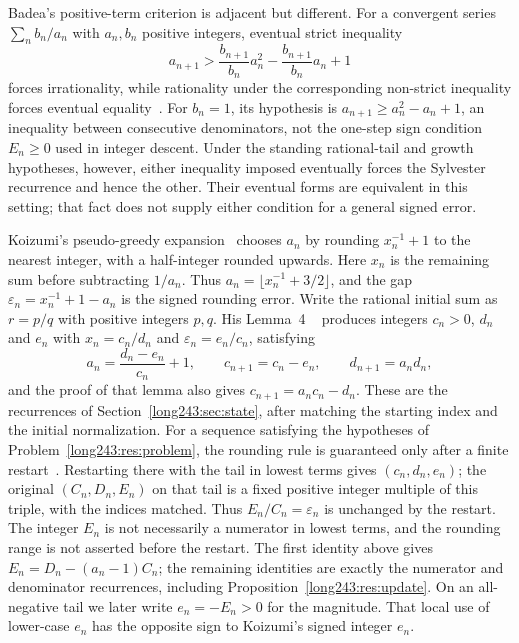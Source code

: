 \documentclass[11pt]{article}
\begin{document}
Badea's positive-term criterion is adjacent but different. For a convergent
series $\sum_n b_n/a_n$ with $a_n,b_n$ positive integers, eventual strict
inequality
\[
 a_{n+1}>\frac{b_{n+1}}{b_n}a_n^2-\frac{b_{n+1}}{b_n}a_n+1
\]
forces irrationality, while rationality under the corresponding non-strict
inequality forces eventual equality~\cite[Theorem~A, p.~313; Cor.~2.2,
p.~316]{badea1993}. For $b_n=1$, its hypothesis is
$a_{n+1}\ge a_n^2-a_n+1$, an inequality between consecutive denominators,
not the one-step sign condition $E_n\ge0$ used in integer descent.
Under the standing rational-tail and growth hypotheses, however, either
inequality imposed eventually forces the Sylvester recurrence and hence the
other. Their eventual forms are equivalent in this setting; that fact
does not supply either condition for a general signed error.

Koizumi's pseudo-greedy expansion~\cite{koizumi2025} chooses $a_n$ by
rounding $x_n^{-1}+1$ to the nearest integer, with a half-integer rounded
upwards. Here $x_n$ is the remaining sum before subtracting $1/a_n$.
Thus $a_n=\lfloor x_n^{-1}+3/2\rfloor$, and the gap
$\varepsilon_n=x_n^{-1}+1-a_n$ is the signed rounding error.
Write the rational initial sum as $r=p/q$ with positive integers $p,q$. His Lemma~4
~\cite[pp.~11--12]{koizumi2025} produces integers $c_n>0$,
$d_n$ and $e_n$ with $x_n=c_n/d_n$ and $\varepsilon_n=e_n/c_n$, satisfying
\[
 a_n=\frac{d_n-e_n}{c_n}+1,\qquad
 c_{n+1}=c_n-e_n,\qquad
 d_{n+1}=a_nd_n ,
\]
and the proof of that lemma also gives $c_{n+1}=a_nc_n-d_n$.
These are the recurrences of Section~\ref{long243:sec:state}, after
matching the starting index and the initial normalization. For a sequence
satisfying the hypotheses of Problem~\ref{long243:res:problem}, the rounding rule is guaranteed
only after a finite restart~\cite[Corollary~3, p.~9]{koizumi2025}. Restarting there
with the tail in lowest terms gives $(c_n,d_n,e_n)$; the original
$(C_n,D_n,E_n)$ on that tail is a fixed positive integer multiple of
this triple, with the indices matched. Thus $E_n/C_n=\varepsilon_n$
is unchanged by the restart. The integer $E_n$ is not necessarily a
numerator in lowest terms, and the rounding range is not asserted
before the restart. The first identity
above gives $E_n=D_n-(a_n-1)C_n$; the remaining identities are exactly
the numerator and denominator recurrences, including
Proposition~\ref{long243:res:update}. On an all-negative tail we later
write $e_n=-E_n>0$ for the magnitude. That local use of lower-case $e_n$
has the opposite sign to Koizumi's signed integer $e_n$.
\end{document}
